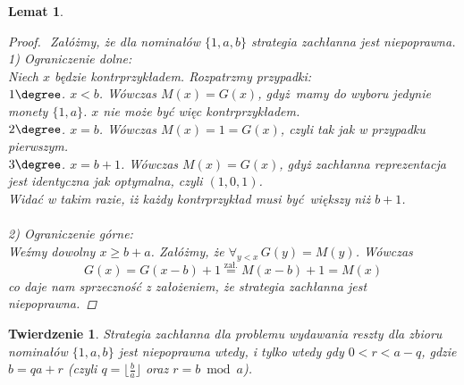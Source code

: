 \documentclass[12pt]{article}
\newtheorem*{theorem*}{Twierdzenie}
\newtheorem{lemma}{Lemat}
\begin{document}
\begin{titlepage}
\begin{lemma}
\begin{proof}$ $\newline
Załóżmy, że dla nominałów $\{1, a, b\}$ strategia zachłanna jest niepoprawna.\\
1) Ograniczenie dolne:\\    
Niech $x$ będzie kontrprzykładem. Rozpatrzmy przypadki:\\
$1\degree$. $x < b$. Wówczas $M(x) = G(x)$, gdyż mamy do
wyboru jedynie monety $\{1, a\}$. $x$ nie może być więc kontrprzykładem.\\
$2\degree$. $x = b$. Wówczas $M(x) = 1 = G(x)$, czyli tak jak w przypadku pierwszym.\\
$3\degree$. $x = b + 1 $. Wówczas $M(x) = G(x)$, gdyż zachłanna reprezentacja jest
identyczna jak optymalna, czyli $(1, 0, 1)$.\\
Widać w takim razie, iż każdy kontrprzykład musi być większy niż $b + 1$.\\\\
2) Ograniczenie górne:\\
Weźmy dowolny $x \geq b + a$. Załóżmy, że $\forall_{y<x}\,G(y) = M(y)$. Wówczas
$$G(x) = G(x-b) + 1 \stackrel{\text{zał.}}{=} M(x-b) + 1 = M(x)$$
co daje nam sprzeczność z założeniem, że strategia zachłanna jest niepoprawna.
\end{proof}
\end{lemma}


\begin{theorem*}\normalfont
Strategia zachłanna dla problemu wydawania reszty dla zbioru nominałów 
$\{1, a, b\}$ jest niepoprawna wtedy, i tylko wtedy gdy $0 < r < a - q$,
gdzie $b = qa + r$ (czyli $q = \lfloor \frac{b}{a} \rfloor$ oraz $r = b \bmod a$).


\end{theorem*}
\end{titlepage}
\end{document}
